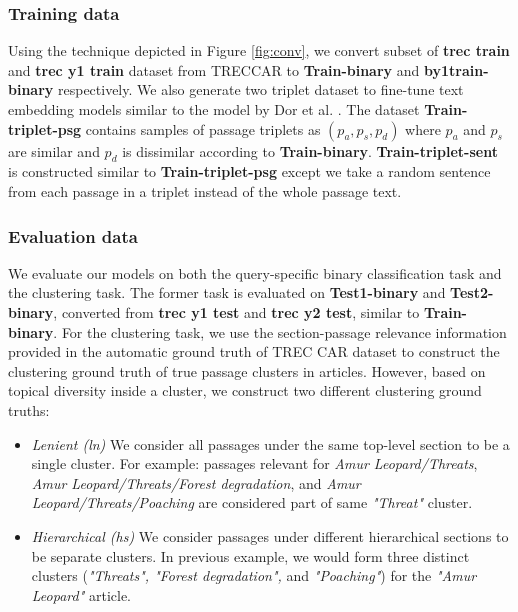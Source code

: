 
\subsubsection{Training data} Using the technique depicted in Figure \ref{fig:conv}, we convert subset of \textbf{trec train} and \textbf{trec y1 train} dataset from TRECCAR to \textbf{Train-binary} and \textbf{by1train-binary} respectively. We also generate two triplet dataset to fine-tune text embedding models similar to the model by Dor et al. . The dataset \textbf{Train-triplet-psg} contains samples of passage triplets as $(p_a, p_s, p_d)$ where $p_a$ and $p_s$ are similar and $p_d$ is dissimilar according to \textbf{Train-binary}. \textbf{Train-triplet-sent} is constructed similar to \textbf{Train-triplet-psg} except we take a random sentence from each passage in a triplet instead of the whole passage text.

\subsubsection{Evaluation data} We evaluate our models on both the query-specific binary classification task and the clustering task. The former task is evaluated on \textbf{Test1-binary} and \textbf{Test2-binary}, converted from \textbf{trec y1 test} and \textbf{trec y2 test}, similar to \textbf{Train-binary}. For the clustering task, we use the section-passage relevance information provided in the automatic ground truth of TREC CAR dataset to construct the clustering ground truth of true passage clusters in articles. However, based on topical diversity inside a cluster, we construct two different clustering ground truths:

\begin{itemize}[leftmargin=.15in]
    \item \textit{Lenient (ln)} We consider all passages under the same top-level section to be a single cluster. For example: passages relevant for \textit{Amur Leopard/Threats}, \textit{Amur Leopard/Threats/Forest degradation}, and \textit{Amur Leopard/Threats/Poaching} are considered part of same \textit{"Threat"} cluster.
    \item \textit{Hierarchical (hs)} We consider passages under different hierarchical sections to be separate clusters. In previous example, we would form three distinct clusters (\textit{"Threats", "Forest degradation",} and \textit{"Poaching"}) for the \textit{"Amur Leopard"} article.
\end{itemize}


